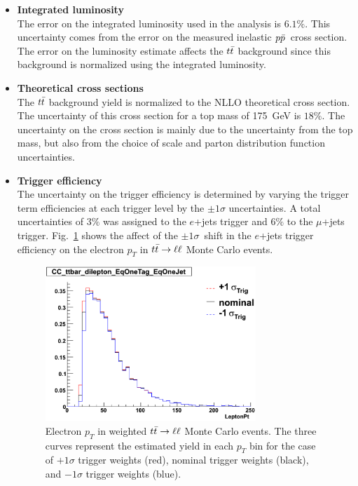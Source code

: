 \begin{itemize}
\item {\bf Integrated luminosity} \\ 
The error on the integrated luminosity used in the analysis is $6.1\%$. This uncertainty comes from the error on the measured inelastic $\mbox{$p\bar{p}$}$~cross section. The error on the luminosity estimate affects the $\mbox{$t\bar{t}$}$ background since this background is normalized using the integrated luminosity.

\item {\bf Theoretical cross sections} \\ 
The $\mbox{$t\bar{t}$}$ background yield is normalized to the NLLO theoretical cross section. The uncertainty of this cross section for a top mass of 175~GeV is $18\%$. The uncertainty on the cross section is mainly due to the uncertainty from the top mass, but also from the choice of scale and parton distribution function uncertainties.

\item {\bf Trigger efficiency} \\
The uncertainty on the trigger efficiency is determined by varying the trigger term efficiencies at each trigger level by the $\pm1\sigma$ uncertainties. A total uncertainties of $3\%$ was assigned to the $e$+jets trigger and $6\%$ to the $\mu$+jets trigger. Fig.~\ref{triggeruncer} shows the affect of the $\pm1\sigma$~shift in the $e$+jets trigger efficiency on the electron $p_{T}$ in $\mbox{$t\bar{t}$} \rightarrow \ell \ell$ Monte Carlo events.

\begin{figure}[!h!tbp]
\begin{center}
\includegraphics[width=0.75\textwidth]{eps/Systematics/trigger.eps}
\end{center}
\vspace{-0.1in}
\caption{Electron $p_{T}$ in weighted $\mbox{$t\bar{t}$} \rightarrow \ell \ell$ Monte Carlo events. The three curves represent the estimated yield in each $p_{T}$ bin for the case of $+1\sigma$ trigger weights (red), nominal trigger weights (black), and $-1\sigma$ trigger weights (blue).}
\label{triggeruncer}
\end{figure}


\end{itemize}
